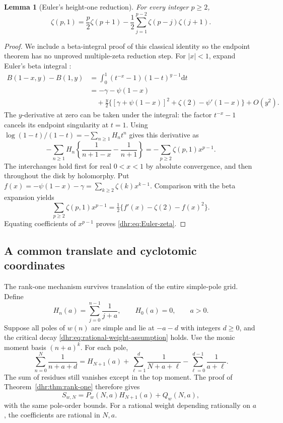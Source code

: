 \documentclass[11pt,letterpaper]{article}
\numberwithin{equation}{section}
\newtheorem{lemma}[theorem]{Lemma}
\theoremstyle{definition}\newtheorem{definition}[theorem]{Definition}
\theoremstyle{remark}\newtheorem{remark}[theorem]{Remark}
\begin{document}
\begin{lemma}[Euler's height-one reduction]\label{dhr:lem:Euler}
For every integer $p\geq2$,
\begin{equation}\label{dhr:eq:Euler-zeta}
 \zeta(p,1)=\frac p2\zeta(p+1)
 -\frac12\sum_{j=1}^{p-2}\zeta(p-j)\zeta(j+1).
\end{equation}
\end{lemma}
\begin{proof}
We include a beta-integral proof of this classical identity so the
endpoint theorem has no unproved multiple-zeta reduction step.
For $|x|<1$, expand Euler's beta integral \cite{dlmf:beta}:
\begin{align*}
 B(1-x,y)-B(1,y)
 &=\int_0^1(t^{-x}-1)(1-t)^{y-1}\mathrm dt\\
 &=-\gamma-\psi(1-x)\\
 &\quad+\frac y2\big\{[\gamma+\psi(1-x)]^2
                          +\zeta(2)-\psi'(1-x)\big\}+O(y^2).
\end{align*}
The $y$-derivative at zero can be taken under the integral: the
factor $t^{-x}-1$ cancels its endpoint singularity at $t=1$.
Using $\log(1-t)/(1-t)=-\sum_{n\geq1}H_nt^n$ gives this derivative
as
\[
 -\sum_{n\geq1}H_n\left\{\frac1{n+1-x}-\frac1{n+1}\right\}
 =-\sum_{p\geq2}\zeta(p,1)x^{p-1}.
\]
The interchanges hold first for real $0<x<1$ by absolute convergence,
and then throughout the disk by holomorphy. Put
$f(x)=-\psi(1-x)-\gamma=\sum_{k\geq2}\zeta(k)x^{k-1}$.
Comparison with the beta expansion yields
\[
 \sum_{p\geq2}\zeta(p,1)x^{p-1}
 =\tfrac12\{f'(x)-\zeta(2)-f(x)^2\}.
\]
Equating coefficients of $x^{p-1}$ proves
\eqref{dhr:eq:Euler-zeta}.
\end{proof}

\subsection{A common translate and cyclotomic coordinates}
The rank-one mechanism survives translation of the entire simple-pole
grid. Define
\[
 H_n(a)=\sum_{j=0}^{n-1}\frac1{j+a},\qquad H_0(a)=0,\qquad a>0.
\]
Suppose all poles of $w(n)$ are simple and lie at $-a-d$ with
integers $d\geq0$, and the critical decay
\eqref{dhr:eq:rational-weight-assumption} holds. Use the monic moment
basis $(n+a)^k$. For each pole,
\[
 \sum_{n=0}^N\frac1{n+a+d}
 =H_{N+1}(a)+\sum_{\ell=1}^d\frac1{N+a+\ell}
                 -\sum_{\ell=0}^{d-1}\frac1{a+\ell}.
\]
The sum of residues still vanishes except in the top moment.
The proof of Theorem~\ref{dhr:thm:rank-one} therefore gives
\begin{equation}\label{dhr:eq:translated-cutoff}
 S_{w,N}=P_w(N,a)H_{N+1}(a)+Q_w(N,a),
\end{equation}
with the same pole-order bounds. For a rational weight depending
rationally on $a$, the coefficients are rational in $N,a$.
\end{document}
